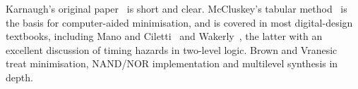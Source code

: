 Karnaugh's original paper~\cite{karnaugh1953} is short and clear. McCluskey's tabular method~\cite{mccluskey1956} is the basis for computer-aided minimisation, and is covered in most digital-design textbooks, including Mano and Ciletti~\cite{mano2018} and Wakerly~\cite{wakerly2006}, the latter with an excellent discussion of timing hazards in two-level logic. Brown and Vranesic~\cite{brown2009} treat minimisation, NAND/NOR implementation and multilevel synthesis in depth.
